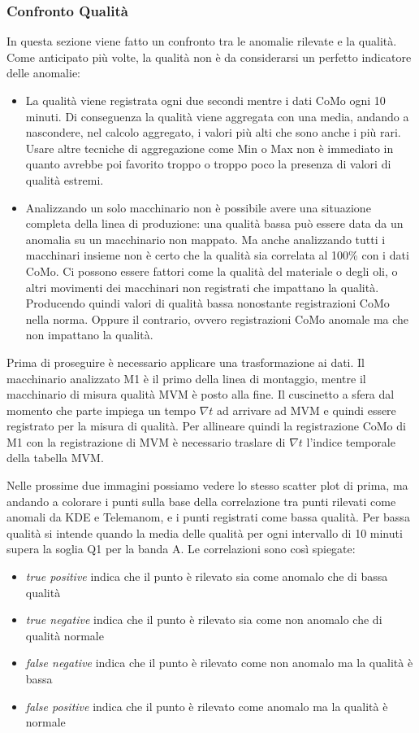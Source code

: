 \subsubsection{Confronto Qualità}
In questa sezione viene fatto un confronto tra le anomalie rilevate e la qualità. Come anticipato più volte, la qualità non è da considerarsi un perfetto indicatore delle anomalie: 
\begin{itemize}
	\item La qualità viene registrata ogni due secondi mentre i dati CoMo ogni 10 minuti. Di conseguenza la qualità viene aggregata con una media, andando a nascondere, nel calcolo aggregato, i valori più alti che sono anche i più rari. Usare altre tecniche di aggregazione come Min o Max non è immediato in quanto avrebbe poi favorito troppo o troppo poco la presenza di valori di qualità estremi.
	\item Analizzando un solo macchinario non è possibile avere una situazione completa della linea di produzione: una qualità bassa può essere data da un anomalia su un macchinario non mappato. Ma anche analizzando tutti i macchinari insieme non è certo che la qualità sia correlata al 100\% con i dati CoMo. Ci possono essere fattori come la qualità del materiale o degli oli, o altri movimenti dei macchinari non registrati che impattano la qualità. Producendo quindi valori di qualità bassa nonostante registrazioni CoMo nella norma. Oppure il contrario, ovvero registrazioni CoMo anomale ma che non impattano la qualità.
\end{itemize}

Prima di proseguire è necessario applicare una trasformazione ai dati. Il macchinario analizzato M1 è il primo della linea di montaggio, mentre il macchinario di misura qualità MVM è posto alla fine. Il cuscinetto a sfera dal momento che parte impiega un tempo ${\nabla}t$ ad arrivare ad MVM e quindi essere registrato per la misura di qualità. Per allineare quindi la registrazione CoMo di M1 con la registrazione di MVM è necessario traslare di ${\nabla}t$ l'indice temporale della tabella MVM.

Nelle prossime due immagini possiamo vedere lo stesso scatter plot di prima, ma andando a colorare i punti sulla base della correlazione tra punti rilevati come anomali da KDE e Telemanom, e i punti registrati come bassa qualità. Per bassa qualità si intende quando la media delle qualità per ogni intervallo di 10 minuti supera la soglia Q1 per la banda A. Le correlazioni sono così spiegate:
\begin{itemize}
	\item \textit{true positive} indica che il punto è rilevato sia come anomalo che di bassa qualità
	\item \textit{true negative} indica che il punto è rilevato sia come non anomalo che di qualità normale
	\item \textit{false negative} indica che il punto è rilevato come non anomalo ma la qualità è bassa
	\item \textit{false positive} indica che il punto è rilevato come anomalo ma la qualità è normale
\end{itemize}

